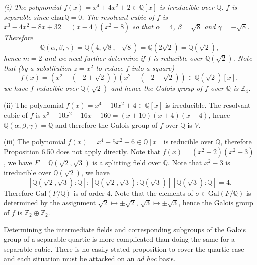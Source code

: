 \begin{example}\em
(i) The polynomial $f(x)=x^4+4x^2+2\in\mathbb{Q}[x]$ is irreducible over $\mathbb{Q}$. $f$ is separable since $\mathrm{char}\mathbb{Q}=0$. The resolvant cubic of $f$ is $x^3-4x^2-8x+32=(x-4)(x^2-8)$ so that $\alpha=4$, $\beta=\sqrt{8}$ and $\gamma=-\sqrt{8}$. Therefore 
$$
\mathbb{Q} \left( \alpha ,\beta ,\gamma \right) =\mathbb{Q} \left( 4,\sqrt{8},-\sqrt{8} \right) =\mathbb{Q} \left( 2\sqrt{2} \right) =\mathbb{Q} \left( \sqrt{2} \right) ,
$$
hence $m=2$ and we need further determine if $f$ is reducible over $\mathbb{Q}(\sqrt{2})$. Note that (by a substitution $z=x^2$ to reduce $f$ into a square) 
$$
f\left( x \right) =\left( x^2-\left( -2+\sqrt{2} \right) \right) \left( x^2-\left( -2-\sqrt{2} \right) \right) \in \mathbb{Q} \left( \sqrt{2} \right) \left[ x \right] ,
$$
we have $f$ reducible over $\mathbb{Q}(\sqrt{2})$ and hence the Galois group of $f$ over $\mathbb{Q}$ is $\mathbb{Z}_4$.\par
(ii) The polynomial $f(x)=x^4-10x^2+4\in\mathbb{Q}[x]$ is irreducible. The resolvant cubic of $f$ is $x^3+10x^2-16x-160=(x+10)(x+4)(x-4)$, hence $\mathbb{Q}(\alpha,\beta,\gamma)=\mathbb{Q}$ and therefore the Galois group of $f$ over $\mathbb{Q}$ is $V$.\par
(iii) The polynomial $f(x)=x^4-5x^2+6\in\mathbb{Q}[x]$ is reducible over $\mathbb{Q}$, therefore Proposition 6.50 does not apply directly. Note that $f(x)=(x^2-2)(x^2-3)$, we have $F=\mathbb{Q}(\sqrt{2},\sqrt{3})$ is a splitting field over $\mathbb{Q}$. Note that $x^2-3$ is irreducible over $\mathbb{Q}(\sqrt{2})$, we have 
$$
\left[ \mathbb{Q} \left( \sqrt{2},\sqrt{3} \right) :\mathbb{Q} \right] :\left[ \mathbb{Q} \left( \sqrt{2},\sqrt{3} \right) :\mathbb{Q} \left( \sqrt{3} \right) \right] \left[ \mathbb{Q} \left( \sqrt{3} \right) :\mathbb{Q} \right] =4.
$$
Therefore $\mathrm{Gal}(F/\mathbb{Q})$ is of order $4$. Note that the elements of $\sigma\in\mathrm{Gal}(F/\mathbb{Q})$ is determined by the assignment $\sqrt{2}\mapsto\pm\sqrt{2}$, $\sqrt{3}\mapsto\pm\sqrt{3}$, hence the Galois group of $f$ is $\mathbb{Z}_2\oplus\mathbb{Z}_2$.
\end{example}
Determining the intermediate fields and corresponding subgroups of the Galois group of a separable quartic is more complicated than doing the same for a separable cubic. There is no easily stated proposition to cover the quartic case and each situation must be attacked on an \textit{ad hoc} basis.
